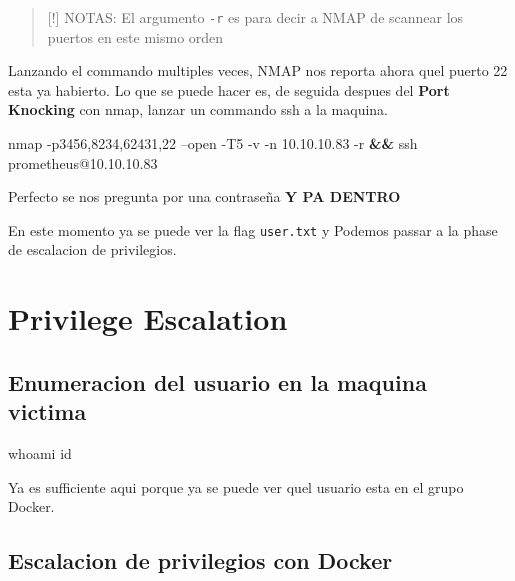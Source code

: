 \documentclass{assets/ipesethesis}
\newenvironment{Shaded}{\begin{snugshade}}{\end{snugshade}}
\newcommand{\FunctionTok}[1]{\textcolor[rgb]{0.00,0.00,0.00}{#1}}
\newcommand{\KeywordTok}[1]{\textcolor[rgb]{0.13,0.29,0.53}{\textbf{#1}}}
\newcommand{\NormalTok}[1]{#1}
\begin{document}
\begin{quote}
{[}!{]} NOTAS: El argumento \texttt{-r} es para decir a NMAP de scannear los puertos en este mismo orden
\end{quote}

Lanzando el commando multiples veces, NMAP nos reporta ahora quel puerto 22 esta ya habierto.
Lo que se puede hacer es, de seguida despues del \textbf{Port Knocking} con nmap, lanzar un commando
ssh a la maquina.

\begin{Shaded}
\begin{Highlighting}[]
\FunctionTok{nmap}\NormalTok{ -p3456,8234,62431,22 --open -T5 -v -n 10.10.10.83 -r }\KeywordTok{&&} \FunctionTok{ssh}\NormalTok{ prometheus@10.10.10.83}
\end{Highlighting}
\end{Shaded}

Perfecto se nos pregunta por una contraseña \textbf{Y PA DENTRO}

En este momento ya se puede ver la flag \texttt{user.txt} y Podemos passar a la phase de escalacion de privilegios.

\hypertarget{privilege-escalation}{%
\section*{Privilege Escalation}\label{privilege-escalation}}

\hypertarget{enumeracion-del-usuario-en-la-maquina-victima}{%
\subsection*{Enumeracion del usuario en la maquina victima}\label{enumeracion-del-usuario-en-la-maquina-victima}}

\begin{Shaded}
\begin{Highlighting}[]
\FunctionTok{whoami}
\FunctionTok{id}
\end{Highlighting}
\end{Shaded}

Ya es sufficiente aqui porque ya se puede ver quel usuario esta en el grupo Docker.

\hypertarget{escalacion-de-privilegios-con-docker}{%
\subsection*{Escalacion de privilegios con Docker}\label{escalacion-de-privilegios-con-docker}}
\end{document}
